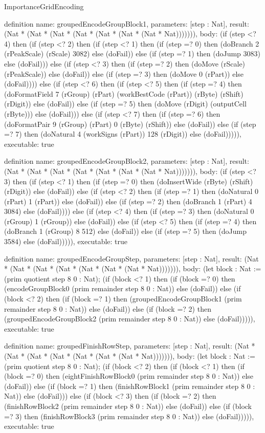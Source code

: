 \begin{lexlean}{ImportanceGridEncoding}
\begin{semanticmodule}
definition{
  name: groupedEncodeGroupBlock1,
  parameters: [step : Nat],
  result: (Nat * (Nat * (Nat * (Nat * (Nat * (Nat * (Nat * Nat))))))),
  body: (if (step <? 4) then
      (if (step <? 2) then
      (if (step <? 1) then
      (if (step =? 0) then (doBranch 2 (rPeakScale) (rScale) 3082) else (doFail)) else
      (if (step =? 1) then (doJump 3083) else (doFail))) else
      (if (step <? 3) then
      (if (step =? 2) then (doMove (rScale) (rPeakScale)) else (doFail)) else
      (if (step =? 3) then (doMove 0 (rPart)) else (doFail)))) else
      (if (step <? 6) then
      (if (step <? 5) then
      (if (step =? 4) then (doFormatField 7 (rGroup) (rPart) (workBestCode (rPart)) (rByte) (rShift) (rDigit)) else (doFail)) else
      (if (step =? 5) then (doMove (rDigit) (outputCell (rByte))) else (doFail))) else
      (if (step <? 7) then
      (if (step =? 6) then (doFormatPair 9 (rGroup) (rPart) 0 (rByte) (rShift)) else (doFail)) else
      (if (step =? 7) then (doNatural 4 (workSigns (rPart)) 128 (rDigit)) else (doFail))))),
  executable: true
}

definition{
  name: groupedEncodeGroupBlock2,
  parameters: [step : Nat],
  result: (Nat * (Nat * (Nat * (Nat * (Nat * (Nat * (Nat * Nat))))))),
  body: (if (step <? 3) then
      (if (step <? 1) then
      (if (step =? 0) then (doInsertWide (rByte) (rShift) (rDigit)) else (doFail)) else
      (if (step <? 2) then
      (if (step =? 1) then (doNatural 0 (rPart) 1 (rPart)) else (doFail)) else
      (if (step =? 2) then (doBranch 1 (rPart) 4 3084) else (doFail)))) else
      (if (step <? 4) then
      (if (step =? 3) then (doNatural 0 (rGroup) 1 (rGroup)) else (doFail)) else
      (if (step <? 5) then
      (if (step =? 4) then (doBranch 1 (rGroup) 8 512) else (doFail)) else
      (if (step =? 5) then (doJump 3584) else (doFail))))),
  executable: true
}

definition{
  name: groupedEncodeGroupStep,
  parameters: [step : Nat],
  result: (Nat * (Nat * (Nat * (Nat * (Nat * (Nat * (Nat * Nat))))))),
  body: (let block : Nat := (prim quotient step 8 0 : Nat); (if (block <? 1) then
      (if (block =? 0) then (encodeGroupBlock0 (prim remainder step 8 0 : Nat)) else (doFail)) else
      (if (block <? 2) then
      (if (block =? 1) then (groupedEncodeGroupBlock1 (prim remainder step 8 0 : Nat)) else (doFail)) else
      (if (block =? 2) then (groupedEncodeGroupBlock2 (prim remainder step 8 0 : Nat)) else (doFail))))),
  executable: true
}

definition{
  name: groupedFinishRowStep,
  parameters: [step : Nat],
  result: (Nat * (Nat * (Nat * (Nat * (Nat * (Nat * (Nat * Nat))))))),
  body: (let block : Nat := (prim quotient step 8 0 : Nat); (if (block <? 2) then
      (if (block <? 1) then
      (if (block =? 0) then (eightFinishRowBlock0 (prim remainder step 8 0 : Nat)) else (doFail)) else
      (if (block =? 1) then (finishRowBlock1 (prim remainder step 8 0 : Nat)) else (doFail))) else
      (if (block <? 3) then
      (if (block =? 2) then (finishRowBlock2 (prim remainder step 8 0 : Nat)) else (doFail)) else
      (if (block =? 3) then (finishRowBlock3 (prim remainder step 8 0 : Nat)) else (doFail))))),
  executable: true
}


\end{semanticmodule}
\end{lexlean}
